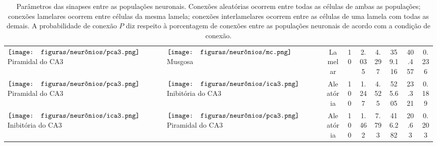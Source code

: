 \begin{table}[h!]
{\begin{tabular}{llccccccc}
$\vcenter{\hbox{\texttt{[image: figuras/neurônios/pca3.png]}}}$ Piramidal do CA3 & $\vcenter{\hbox{\texttt{[image: figuras/neurônios/mc.png]}}}$ Musgosa & Lamelar & 10 & 2.035 & 4.297 & 359.116 & 40.457 & 0.236 \\
$\vcenter{\hbox{\texttt{[image: figuras/neurônios/pca3.png]}}}$ Piramidal do CA3 & $\vcenter{\hbox{\texttt{[image: figuras/neurônios/ica3.png]}}}$ Inibitória do CA3 & Aleatória & 100 & 1.247 & 4.525 & 525.605 & 23.321 & 0.189 \\
$\vcenter{\hbox{\texttt{[image: figuras/neurônios/ica3.png]}}}$ Inibitória do CA3 & $\vcenter{\hbox{\texttt{[image: figuras/neurônios/pca3.png]}}}$ Piramidal do CA3 & Aleatória & 100 & 1.462 & 7.793 & 416.282 & 20.63 & 0.203 \\
\bottomrule
\end{tabular}}
\caption{Parâmetros das sinapses entre as populações neuronais. Conexões aleatórias ocorrem entre todas as células
              de ambas as populações; conexões lamelares ocorrem entre células da mesma lamela; conexões interlamelares ocorrem
              entre as células de uma lamela com todas as demais. A probabilidade de conexão $P$ diz respeito à porcentagem de
              conexões entre as populações neuronais de acordo com a condição de conexão.}
\label{tab:synapse_params}
\end{table}
